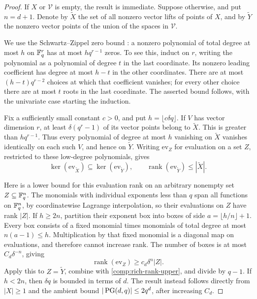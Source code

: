 \begin{proof}
If \(X\) or \(\mathcal V\) is empty, the result is immediate.
Suppose otherwise, and put \(n=d+1\).
Denote by \(\widetilde X\) the set of all nonzero vector
lifts of points of \(X\), and by \(\widetilde Y\) the nonzero vector
points of the union of the spaces in \(\mathcal V\).

We use the Schwartz--Zippel zero bound
\cite{Schwartz1980,Zippel1979}: a nonzero polynomial of total degree
at most \(h\) on \(\mathbb F_q^r\) has at most \(hq^{r-1}\) zeros. To see this,
induct on \(r\), writing the polynomial as a polynomial of degree \(t\)
in the last coordinate. Its nonzero leading coefficient has degree
at most \(h-t\) in the other coordinates. There are at most
\((h-t)q^{r-2}\) choices at which that coefficient vanishes; for every
other choice there are at most \(t\) roots in the last coordinate.
The asserted bound follows, with the univariate case starting the
induction.

Fix a sufficiently small constant \(c>0\), and put
\(h=\lfloor c\delta q\rfloor\).
If \(V\) has vector dimension \(r\), at least
\(\delta(q^r-1)\) of its vector points belong to \(\widetilde X\).
This is greater than \(hq^{r-1}\). Thus every polynomial of degree
at most \(h\) vanishing on \(\widetilde X\) vanishes identically on
each such \(V\), and hence on \(\widetilde Y\).
Writing \(\mathrm{ev}_Z\) for evaluation on a set \(Z\), restricted to
these low-degree polynomials, gives
\begin{equation}\label{comp:rich-rank-upper}
 \ker(\mathrm{ev}_{\widetilde X})
       \subseteq\ker(\mathrm{ev}_{\widetilde Y}),
 \qquad
 \operatorname{rank}(\mathrm{ev}_{\widetilde Y})
       \le|\widetilde X|.
\end{equation}

Here is a lower bound for this evaluation rank on an arbitrary
nonempty set \(Z\subseteq\mathbb F_q^n\).
The monomials with individual exponents less than \(q\) span all
functions on \(\mathbb F_q^n\), by coordinatewise Lagrange interpolation,
so their evaluations on \(Z\) have rank \(|Z|\).
If \(h\ge2n\), partition their exponent box into boxes of side
\(a=\lfloor h/n\rfloor+1\). Every box consists of a fixed monomial
times monomials of total degree at most \(n(a-1)\le h\).
Multiplication by that fixed monomial is a diagonal map on
evaluations, and therefore cannot increase rank. The number of
boxes is at most \(C_d\delta^{-n}\), giving
\[
 \operatorname{rank}(\mathrm{ev}_Z)
       \ge c_d\delta^n|Z|.
\]
Apply this to \(Z=\widetilde Y\), combine with
\eqref{comp:rich-rank-upper}, and divide by \(q-1\).
If \(h<2n\), then \(\delta q\) is bounded in terms of \(d\).
The result instead follows directly from \(|X|\ge1\) and the
ambient bound \(|\operatorname{PG}(d,q)|\le2q^d\), after increasing \(C_d\).
\end{proof}

